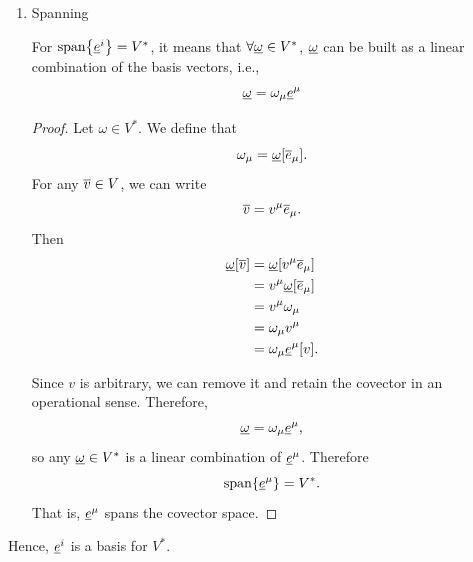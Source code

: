 \begin{solution_pset}
\begin{enumerate}[(1)]
\begin{enumerate}
\begin{proof}
							Evaluating both sides on $e_\nu\in V$ gives
							\begin{align*}
								a_\mu \und e^\mu[\ovr e_\nu]
								&=\und 0[\ovr e_\nu]\\
								a_\mu\delta^\mu_\nu
								&=0\\
								a_\nu&=0.
							\end{align*}
							Since this holds for every $\nu$, we have
							$a_\mu=0$ for all $\mu$. Hence
							$\{\und e^\mu\}$ is linearly independent.
						\end{proof}
					\item Spanning

						For $\mathrm{span} \qty{\underline{e}^i} = V^*$, it means that
						$\forall \underline{\omega}\in V^*$, $\underline{\omega}$ can be built as a linear combination of the basis vectors,
						i.e.,
						\[
							\underline{\omega} = \omega_\mu \underline{e}^\mu
						\]
						\begin{proof}
							Let $\omega\in V^*$. We define that
							\[
								\omega_\mu=\underline{\omega}[\overline{e}_\mu].
							\]
							For any $\overline{v}\in V$, we can write
							\[
								\overline{v}=v^\mu \overline{e}_\mu.
							\]
							Then
							\begin{align*}
								\underline{\omega}[\overline{v}]
								&=\underline{\omega}[v^\mu \overline{e}_\mu]\\
								&=v^\mu\underline{\omega}[\overline{e}_\mu]\\
								&=v^\mu\omega_\mu \\
								&= \omega_\mu v^\mu\\
								&=\omega_\mu \underline{e}^\mu[v].
							\end{align*}

							Since $v$ is arbitrary, we can remove it and
							retain the covector in an operational sense.
							Therefore,
							\[
								\underline{\omega}=\omega_\mu \underline{e}^\mu,
							\]
							so any $\underline{\omega}\in V^*$ is a linear combination
							of $\underline{e}^\mu$. Therefore
							\[
								\mathrm{span}{\{\underline{e}^\mu\}}=V^*.
							\]
							That is, $\underline{e}^\mu$ spans the covector space.
						\end{proof}
				\end{enumerate}

				Hence, $\underline{e}^i$ is a basis for $V^*$.
		\end{enumerate}

	\end{solution_pset}
	\newpage
